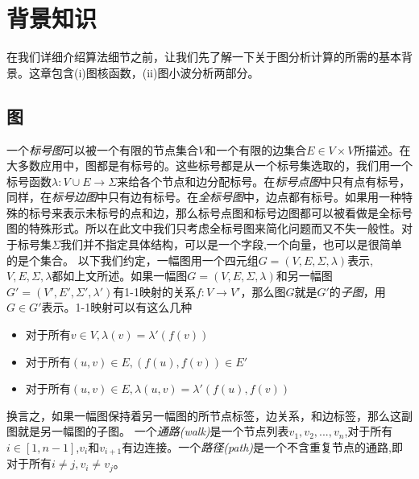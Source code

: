 \documentclass{article}
\begin{document}
\else
\fi
\chapter{背景知识}
在我们详细介绍算法细节之前，让我们先了解一下关于图分析计算的所需的基本背景。这章包含(i)图核函数，(ii)图小波分析两部分。
\section{图}
一个\emph{标号图}可以被一个有限的节点集合$V$和一个有限的边集合$E\in V\times V$所描述。在大多数应用中，图都是有标号的。这些标号都是从一个标号集选取的，我们用一个标号函数$\lambda :V\cup E\rightarrow \Sigma$来给各个节点和边分配标号。在\emph{标号点图}中只有点有标号，同样，在\emph{标号边图}中只有边有标号。在\emph{全标号图}中，边点都有标号。如果用一种特殊的标号来表示未标号的点和边，那么标号点图和标号边图都可以被看做是全标号图的特殊形式。所以在此文中我们只考虑全标号图来简化问题而又不失一般性。对于标号集$\Sigma$我们并不指定具体结构，可以是一个字段,一个向量，也可以是很简单的是个集合。
以下我们约定，一幅图用一个四元组$G=(V,E,\Sigma ,\lambda )$表示,$V,E,\Sigma,\lambda$都如上文所述。如果一幅图$G=(V,E,\Sigma,\lambda)$和另一幅图$G'=(V',E',\Sigma',\lambda')$有1-1映射的关系$f:V\rightarrow V'$，那么图$G$就是$G'$的\emph{子图}，用$G\in G' $表示。1-1映射可以有这么几种
\begin{itemize}
    \item 对于所有$v\in V,\lambda(v)=\lambda '(f(v))$
    \item 对于所有$(u,v)\in E,(f(u),f(v))\in E'$
    \item 对于所有$(u,v)\in E,\lambda(u,v)=\lambda '(f(u),f(v)) $
\end{itemize}
换言之，如果一幅图保持着另一幅图的所节点标签，边关系，和边标签，那么这副图就是另一幅图的子图。
一个\emph{通路(walk)}是一个节点列表$v_1,v_2,...,v_n$,对于所有$i\in [1,n-1]$,$v_i$和$v_{i+1}$有边连接。一个\emph{路径(path)}是一个不含重复节点的通路,即对于所有$i\neq j,v_i \neq v_j$。
\end{document}
